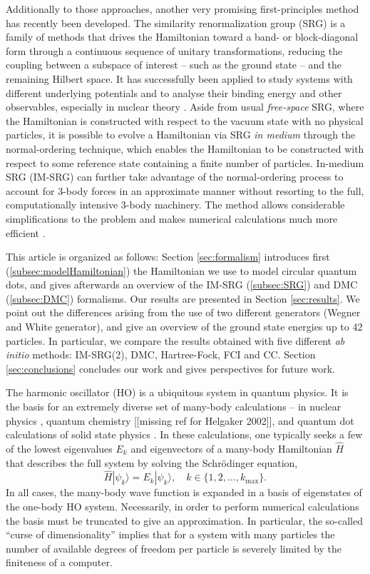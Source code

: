 \documentclass[amsmath, amssymb, aps, floatfix, nofootinbib, preprintnumbers,showpacs, superscriptaddress, twocolumn]{revtex4-1}
\newcommand{\ket}[1]{| #1 \rangle}
\begin{document}
Additionally to those approaches, another very promising first-principles
method has recently been developed.  The similarity renormalization group
(SRG) is a family of methods that drives the Hamiltonian toward a band- or
block-diagonal form through a continuous sequence of unitary transformations,
reducing the coupling between a subspace of interest -- such as the ground
state -- and the remaining Hilbert space.  It has successfully been applied to
study systems with different underlying potentials and to analyse their
binding energy and other observables, especially in nuclear theory
\cite{ScottSRG,PhysRevC.75.061001,SRGThreeDim}.  Aside from usual
\emph{free-space} SRG, where the Hamiltonian is constructed with respect to
the vacuum state with no physical particles, it is possible to evolve a
Hamiltonian via SRG \emph{in medium} through the normal-ordering technique,
which enables the Hamiltonian to be constructed with respect to some reference
state containing a finite number of particles.  In-medium SRG (IM-SRG) can
further take advantage of the normal-ordering process to account for 3-body
forces in an approximate manner without resorting to the full, computationally
intensive 3-body machinery.  The method allows considerable simplifications to
the problem and makes numerical calculations much more efficient \cite{IMSRG}.

This article is organized as follows: Section \ref{sec:formalism} introduces
first (\ref{subsec:modelHamiltonian}) the Hamiltonian we use to model circular
quantum dots, and gives afterwards an overview of the IM-SRG
(\ref{subsec:SRG}) and DMC (\ref{subsec:DMC}) formalisms.  Our results are
presented in Section \ref{sec:results}.  We point out the differences arising
from the use of two different generators (Wegner and White generator), and
give an overview of the ground state energies up to 42 particles. In
particular, we compare the results obtained with five different \textit{ab
  initio} methods: IM-SRG(2), DMC, Hartree-Fock, FCI and CC. Section
\ref{sec:conclusions} concludes our work and gives perspectives for future
work.

The harmonic oscillator (HO) is a ubiquitous system in quantum physics. It is the basis for an extremely diverse set of many-body calculations -- in nuclear physics \cite{HJORTHJENSEN1995125}, quantum chemistry \cite{Helgaker2002} [[missing ref for Helgaker 2002]], and quantum dot calculations of solid state physics \cite{reimann2002}. In these calculations, one typically seeks a few of the lowest eigenvalues $E_k$ and eigenvectors of a many-body Hamiltonian $\hat{H}$ that describes the full system by solving the Schr\"odinger equation,
\begin{equation*}
\hat{H} \ket{\psi_k} = E_k \ket{\psi_k}, \quad k \in \{1, 2, \ldots, k_{\text{max}}\}.
\end{equation*}
In all cases, the many-body wave function is expanded in a basis of
eigenstates of the one-body HO system.  Necessarily, in order to perform
numerical calculations the basis must be truncated to give an approximation.
In particular, the so-called ``curse of dimensionality'' implies that for a
system with many particles the number of available degrees of freedom per
particle is severely limited by the finiteness of a computer.
\end{document}
